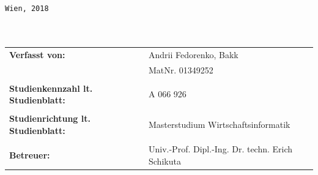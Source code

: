 \begin{verbatim}


Wien, 2018



\end{verbatim}
\begin{flushleft}
\begin{tabular}{llll}
\textbf{Verfasst von:} & & Andrii Fedorenko, Bakk \\
& & MatNr. 01349252 & \\
& & \\
\textbf{Studienkennzahl lt. Studienblatt:} & & A 066 926 &\\
& & \\
\textbf{Studienrichtung lt. Studienblatt:} & & Masterstudium Wirtschaftsinformatik &\\
& & \\
\textbf{Betreuer:} & & Univ.-Prof. Dipl.-Ing. Dr. techn. Erich Schikuta &\\
\end{tabular}
\end{flushleft}

\newpage